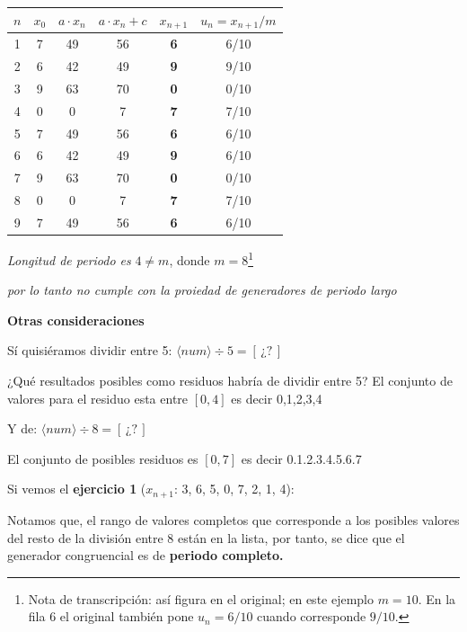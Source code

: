 \documentclass[11pt,letterpaper]{report}
\begin{document}
\begin{table}[H]
\centering
\begin{tabular}{|c|c|c|c|c|c|}
\hline
$n$ & $x_0$ & $a \cdot x_n$ & $a \cdot x_n + c$ & $x_{n+1}$ & $u_n = x_{n+1}/m$\\
\hline
1 & 7 & 49 & 56 & \textbf{6} & 6/10\\
2 & 6 & 42 & 49 & \textbf{9} & 9/10\\
3 & 9 & 63 & 70 & \textbf{0} & 0/10\\
4 & 0 & 0 & 7 & \textbf{7} & 7/10\\
\hline
5 & 7 & 49 & 56 & \textbf{6} & 6/10\\
6 & 6 & 42 & 49 & \textbf{9} & 6/10\\
7 & 9 & 63 & 70 & \textbf{0} & 0/10\\
8 & 0 & 0 & 7 & \textbf{7} & 7/10\\
\hline
9 & 7 & 49 & 56 & \textbf{6} & 6/10\\
\hline
\end{tabular}
\end{table}

\textit{Longitud de periodo es} $4 \neq m$, donde $m = 8$\footnote{Nota de transcripción: así figura en el original; en este ejemplo $m = 10$. En la fila 6 el original también pone $u_n = 6/10$ cuando corresponde $9/10$.}

\begin{center}
\colorbox[gray]{0.92}{\parbox{0.9\textwidth}{\centering\itshape por lo tanto no cumple con la proiedad de generadores de periodo largo}}
\end{center}

\textbf{Otras consideraciones}

Sí quisiéramos dividir entre 5: $\langle num \rangle \div 5 = [\,\text{¿?}\,]$

¿Qué resultados posibles como residuos habría de dividir entre 5? El conjunto de valores para el residuo esta entre $[0,4]$ es decir 0,1,2,3,4

Y de: $\langle num \rangle \div 8 = [\,\text{¿?}\,]$

El conjunto de posibles residuos es $[0,7]$ es decir 0.1.2.3.4.5.6.7

Si vemos el \textbf{ejercicio 1} ($x_{n+1}$: 3, 6, 5, 0, 7, 2, 1, 4):

Notamos que, el rango de valores completos que corresponde a los posibles valores del resto de la división entre 8 están en la lista, por tanto, se dice que el generador congruencial es de \textbf{periodo completo.}
\end{document}
